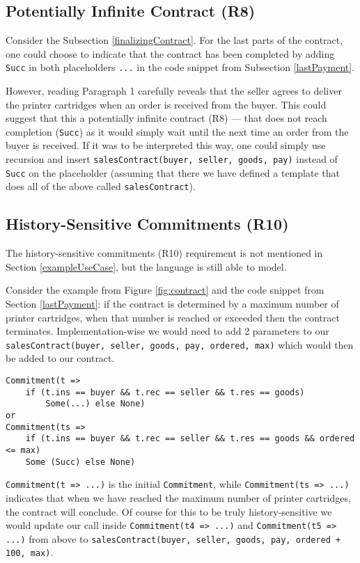 \documentclass{ituthesis}
\begin{document}
\subsection{Potentially Infinite Contract (R8)}
Consider the Subsection \ref{finalizingContract}. For the last parts of the contract, one could choose to indicate that the contract has been completed by adding \texttt{Succ} in both placeholders \texttt{...} in the code snippet from Subsection \ref{lastPayment}. 

However, reading Paragraph 1 carefully reveals that the seller agrees to deliver the printer cartridges when an order is received from the buyer. This could suggest that this a potentially infinite contract (R8) --- that does not reach completion (\texttt{Succ}) as it would simply wait until the next time an order from the buyer is received. If it was to be interpreted this way, one could simply use recursion and insert \texttt{salesContract(buyer, seller, goods, pay)} instead of \texttt{Succ} on the placeholder (assuming that there we have defined a template that does all of the above called \texttt{salesContract}).

\subsection{History-Sensitive Commitments (R10)}
The history-sensitive commitments (R10) requirement is not mentioned in Section \ref{exampleUseCase}, but the language is still able to model.

Consider the example from Figure \ref{fig:contract} and the code snippet from Section \ref{lastPayment}: if the contract is determined by a maximum number of printer cartridges, when that number is reached or exceeded then the contract terminates. Implementation-wise we would need to add 2 parameters to our \texttt{salesContract(buyer, seller, goods, pay, ordered, max)} which would then be added to our contract.
\begin{lstlisting}
Commitment(t => 
    if (t.ins == buyer && t.rec == seller && t.res == goods) 
        Some(...) else None)
or
Commitment(ts => 
    if (t.ins == buyer && t.rec == seller && t.res == goods && ordered <= max)
    Some (Succ) else None)
\end{lstlisting}
\texttt{Commitment(t => ...)} is the initial \texttt{Commitment}, while \texttt{Commitment(ts => ...)} indicates that when we have reached the maximum number of printer cartridges, the contract will conclude. Of course for this to be truly history-sensitive we would update our call inside \texttt{Commitment(t4 => ...)} and \texttt{Commitment(t5 => ...)} from above to \texttt{salesContract(buyer, seller, goods, pay, ordered + 100, max)}.
\end{document}
